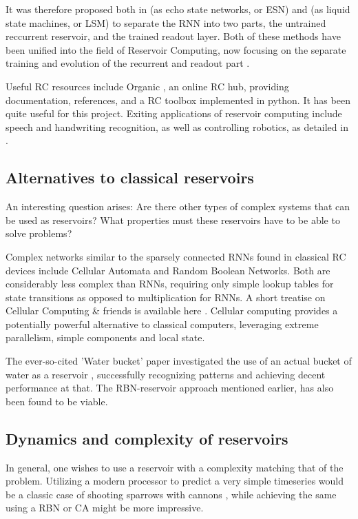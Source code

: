 It was therefore proposed both in \cite{jaeger2002adaptive} (as echo state networks, or ESN)
and \cite{natschlager2002liquid} (as liquid state machines, or LSM) to separate the RNN into two parts,
the untrained reccurrent reservoir, and the trained readout layer.
Both of these methods have been unified into the field of Reservoir Computing,
now focusing on the separate training and evolution of the recurrent and readout part \cite{lukovsevivcius2012reservoir}.

Useful RC resources include Organic \cite{organic}, an online RC hub,
providing documentation, references, and a RC toolbox implemented in python.
It has been quite useful for this project.
Exiting applications of reservoir computing include speech and handwriting recognition,
as well as controlling robotics, as detailed in \cite{lukovsevivcius2012reservoir}.

\subsection{Alternatives to classical reservoirs}

An interesting question arises:
Are there other types of complex systems that can be used as reservoirs?
What properties must these reservoirs have to be able to solve problems?

Complex networks similar to the sparsely connected RNNs found in classical RC devices include Cellular Automata and Random Boolean Networks.
Both are considerably less complex than RNNs, requiring only simple lookup tables for state transitions as opposed to multiplication for RNNs.
A short treatise on Cellular Computing \& friends is available here \cite{sipper1999emergence}.
Cellular computing provides a potentially powerful alternative to classical computers,
leveraging extreme parallelism, simple components and local state.

The ever-so-cited 'Water bucket' paper investigated the use of an actual bucket of water as a reservoir \cite{fernando2003pattern},
successfully recognizing patterns and achieving decent performance at that.
The RBN-reservoir \cite{rbn-reservoir} approach mentioned earlier, has also been found to be viable.

\subsection{Dynamics and complexity of reservoirs}

In general, one wishes to use a reservoir with a complexity matching that of the problem.
Utilizing a modern processor to predict a very simple timeseries would be a classic case of shooting sparrows with cannons \cite{wiki:sparrow},
while achieving the same using a RBN or CA might be more impressive.

